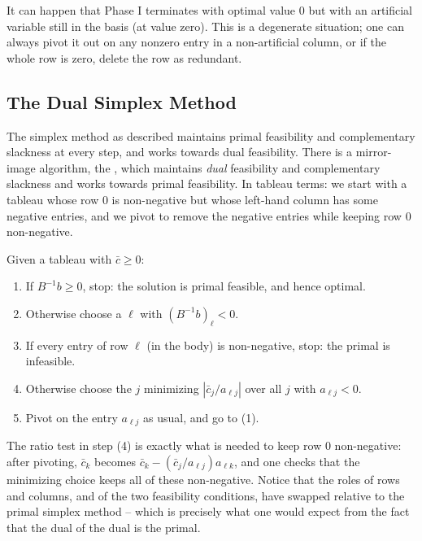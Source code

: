 \begin{remark}
    It can happen that Phase I terminates with optimal value $0$ but with an artificial variable still in the basis (at value zero). This is a degenerate situation; one can always pivot it out on any nonzero entry in a non-artificial column, or if the whole row is zero, delete the row as redundant.
\end{remark}

\subsection{The Dual Simplex Method}

The simplex method as described maintains primal feasibility and complementary slackness at every step, and works towards dual feasibility. There is a mirror-image algorithm, the , which maintains \emph{dual} feasibility and complementary slackness and works towards primal feasibility. In tableau terms: we start with a tableau whose row $0$ is non-negative but whose left-hand column has some negative entries, and we pivot to remove the negative entries while keeping row $0$ non-negative.

\begin{definition}
    Given a tableau with $\bar c \geq 0$:
    \begin{enumerate}[label=(\arabic*)]
        \item If $B^{-1}b \geq 0$, stop: the solution is primal feasible, and hence optimal.
        \item Otherwise choose a  $\ell$ with $(B^{-1}b)_\ell < 0$.
        \item If every entry of row $\ell$ (in the body) is non-negative, stop: the primal is infeasible.
        \item Otherwise choose the  $j$ minimizing $\left|\bar c_j / a_{\ell j}\right|$ over all $j$ with $a_{\ell j} < 0$.
        \item Pivot on the entry $a_{\ell j}$ as usual, and go to (1).
    \end{enumerate}
\end{definition}

The ratio test in step (4) is exactly what is needed to keep row $0$ non-negative: after pivoting, $\bar c_k$ becomes $\bar c_k - (\bar c_j / a_{\ell j})a_{\ell k}$, and one checks that the minimizing choice keeps all of these non-negative. Notice that the roles of rows and columns, and of the two feasibility conditions, have swapped relative to the primal simplex method -- which is precisely what one would expect from the fact that the dual of the dual is the primal.

